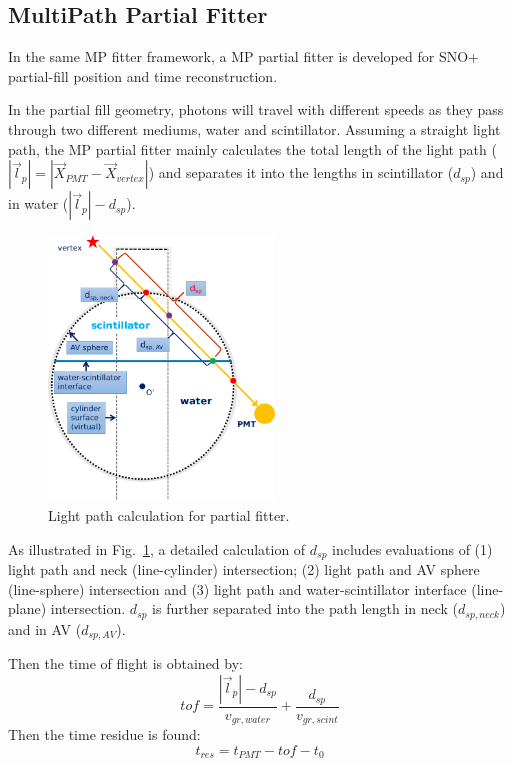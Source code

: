 \documentclass[preprint,12pt]{elsarticle}
\numberwithin{equation}{section}
\begin{document}
\subsection{MultiPath Partial Fitter}
In the same MP fitter framework, a MP partial fitter is developed for SNO+ partial-fill position and time reconstruction.

In the partial fill geometry, photons will travel with different speeds as they pass through two different mediums, water and scintillator. Assuming a straight light path, the MP partial fitter mainly calculates the total length of the light path ($|\vec{l}_p|=|\vec{X}_{PMT}-\vec{X}_{vertex}|$) and separates it into the lengths in scintillator ($d_{sp}$) and in water ($|\vec{l}_p|-d_{sp}$).

\begin{figure}[!htb]
	\centering
	\includegraphics[width=6cm]{scintpath.png}
	\caption{Light path calculation for partial fitter.}
	\label{scintpath}
\end{figure}

As illustrated in Fig.~\ref{scintpath}, a detailed calculation of $d_{sp}$ includes evaluations of (1) light path and neck (line-cylinder) intersection; (2) light path and AV sphere (line-sphere) intersection and (3) light path and water-scintillator interface (line-plane) intersection. $d_{sp}$ is further separated into the path length in neck ($d_{sp,neck}$) and in AV ($d_{sp,AV}$).

Then the time of flight is obtained by:
\begin{equation}
tof = \frac{|\vec{l}_p|-d_{sp}}{v_{gr,water}} +\frac{d_{sp}}{v_{gr,scint}}
\end{equation}
Then the time residue is found:
\begin{equation}
t_{res} = t_{PMT}-tof-t_0
\end{equation}
\end{document}
